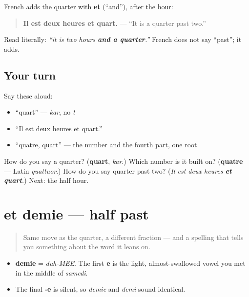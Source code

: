 \begin{grammarlens}[title={Grammar Lens: adding to the hour}]
French adds the quarter with \textbf{et} (\textquotedblleft{}and\textquotedblright{}), after the hour:

\begin{quote}
\textbf{Il est deux heures et quart.} — \textquotedblleft{}It is a quarter past two.\textquotedblright{}
\end{quote}

Read literally: \emph{\textquotedblleft{}it is two hours \textbf{and a quarter}.\textquotedblright{}} French does not say \textquotedblleft{}past\textquotedblright{}; it adds.
\end{grammarlens}

\subsection*{Your turn}
Say these aloud:

\begin{itemize}
\raggedright
  \item \textquotedblleft{}quart\textquotedblright{} — \emph{kar}, no \emph{t}
  \item \textquotedblleft{}Il est deux heures et quart.\textquotedblright{}
  \item \textquotedblleft{}quatre, quart\textquotedblright{} — the number and the fourth part, one root
\end{itemize}

\begin{tcolorbox}[breakable,colback=teal!4,colframe=teal!35!black,title={Before you move on}]
How do you say a quarter? (\textbf{quart}, \emph{kar}.) Which number is it built on? (\textbf{quatre} — Latin \emph{quattuor}.) How do you say quarter past two? (\emph{Il est deux heures \textbf{et quart}.}) Next: the half hour.
\end{tcolorbox}
\section[et demie]{et demie — half past}

\label{lesson:FR-C08-demie}



\begin{quote}
Same move as the quarter, a different fraction — and a spelling that tells you something about the word it leans on.
\end{quote}

\begin{sounds}
\begin{itemize}
\raggedright
  \item \textbf{demie} = \emph{duh-MEE}. The first \textbf{e} is the light, almost-swallowed vowel you met in the middle of \emph{samedi}.
  \item The final \textbf{-e} is silent, so \emph{demie} and \emph{demi} sound identical.
\end{itemize}
\end{sounds}

